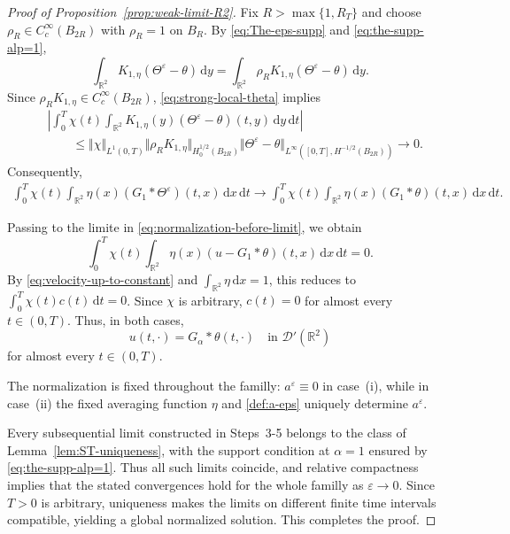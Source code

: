 \documentclass[reqno,11pt,a4paper]{amsart}
\newcommand{\dd}{\mathrm{d}}
\begin{document}
\begin{proof}[Proof of Proposition~\ref{prop:weak-limit-R2}]
Fix $R>\max\{1,R_T\}$ and choose
$\rho_R\in C_c^\infty(B_{2R})$
with $\rho_R=1$ on $B_R$.
By \eqref{eq:The-eps-supp}
and \eqref{eq:the-supp-alp=1},
\[
  \int_{\mathbb R^2}
  K_{1,\eta}(\Theta^\varepsilon-\theta)\,\dd y
  =
  \int_{\mathbb R^2}
  \rho_R K_{1,\eta}(\Theta^\varepsilon-\theta)\,\dd y.
\]
Since $\rho_R K_{1,\eta}\in C_c^\infty(B_{2R})$,
\eqref{eq:strong-local-theta} implies
\begin{align*}
  &\left|
    \int_0^T\chi(t)\int_{\mathbb R^2}
    K_{1,\eta}(y)
    (\Theta^\varepsilon-\theta)(t,y)\,\dd y\,\dd t
  \right|
  \\
  &\qquad\leq
  \Vert \chi\Vert _{L^1(0,T)}
  \Vert \rho_RK_{1,\eta}\Vert _{H_0^{1/2}(B_{2R})}
  \Vert \Theta^\varepsilon-\theta\Vert _
    {L^\infty([0,T],H^{-1/2}(B_{2R}))}
  \longrightarrow0.
\end{align*}
Consequently,
\begin{equation}\label{eq:limit-normalization-convolution}
\begin{aligned}
  \int_0^T\chi(t)\int_{\mathbb R^2}
  \eta(x)(G_1*\Theta^\varepsilon)(t,x)\,\dd x\,\dd t
  \longrightarrow
  \int_0^T\chi(t)\int_{\mathbb R^2}
  \eta(x)(G_1*\theta)(t,x)\,\dd x\,\dd t.
\end{aligned}
\end{equation}

Passing to the limite in
\eqref{eq:normalization-before-limit}, we obtain
\[
  \int_0^T\chi(t)\int_{\mathbb R^2}
  \eta(x)(u-G_1*\theta)(t,x)\,\dd x\,\dd t=0.
\]
By \eqref{eq:velocity-up-to-constant}
and $\int_{\mathbb R^2}\eta\,\dd x=1$,
this reduces to
$\int_0^T\chi(t)c(t)\,\dd t=0$.
Since $\chi$ is arbitrary, $c(t)=0$
for almost every $t\in(0,T)$.
Thus, in both cases,
\[
  u(t,\cdot)=G_\alpha*\theta(t,\cdot)
  \quad\text{in }\mathcal D'(\mathbb R^2)
\]
for almost every $t\in(0,T)$.

The normalization is fixed throughout the familly:
$a^\varepsilon\equiv0$ in case~(i), while in case~(ii)
the fixed averaging function $\eta$ and \eqref{def:a-eps}
uniquely determine $a^\varepsilon$.

Every subsequential limit constructed in Steps~3-5
belongs to the class of Lemma~\ref{lem:ST-uniqueness},
with the support condition at $\alpha=1$
ensured by \eqref{eq:the-supp-alp=1}.
Thus all such limits coincide, and relative compactness
implies that the stated convergences hold
for the whole familly as $\varepsilon\to0$.
Since $T>0$ is arbitrary, uniqueness makes the limits
on different finite time intervals compatible,
yielding a global normalized solution.
This completes the proof.
\end{proof}
\end{document}
